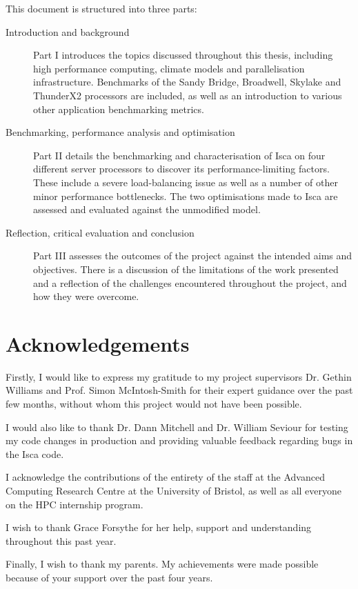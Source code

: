 \documentclass[a4paper,11pt]{report}
\begin{document}
\par
This document is structured into three parts:
\begin{description}

	\item[Introduction and background] Part I introduces the topics discussed throughout this thesis, including high performance computing, climate models and parallelisation infrastructure. Benchmarks of the Sandy Bridge, Broadwell, Skylake and ThunderX2 processors are included, as well as an introduction to various other application benchmarking metrics. 
	
	\item[Benchmarking, performance analysis and optimisation] Part II details the benchmarking and characterisation of Isca on four different server processors to discover its performance-limiting factors. These include a severe load-balancing issue as well as a number of other minor performance bottlenecks. The two optimisations made to Isca are assessed and evaluated against the unmodified model. 
	
	\item[Reflection, critical evaluation and conclusion] Part III assesses the outcomes of the project against the intended aims and objectives. There is a discussion of the limitations of the work presented and a reflection of the challenges encountered throughout the project, and how they were overcome.
\end{description}

  

\chapter*{Acknowledgements}
Firstly, I would like to express my gratitude to my project supervisors Dr. Gethin Williams and Prof. Simon McIntosh-Smith for their expert guidance over the past few months, without whom this project would not have been possible. 
\par
I would also like to thank Dr. Dann Mitchell and Dr. William Seviour for testing my code changes in production and providing valuable feedback regarding bugs in the Isca code. 
\par
I acknowledge the contributions of the entirety of the staff at the Advanced Computing Research Centre at the University of Bristol, as well as all everyone on the HPC internship program. 
\par
I wish to thank Grace Forsythe for her help, support and understanding throughout this past year.
\par
Finally, I wish to thank my parents. My achievements were made possible because of your support over the past four years. 
\end{document}
